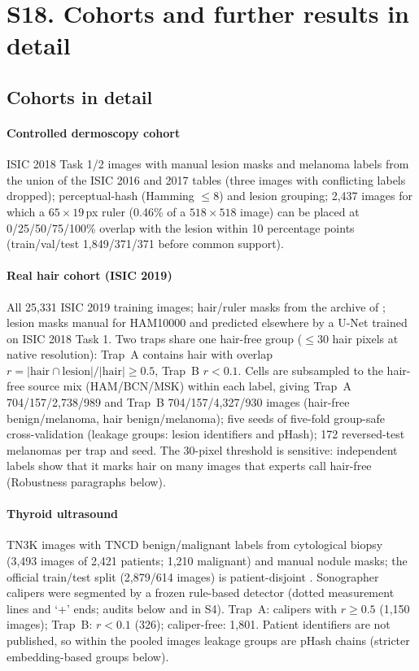 \section*{S18. Cohorts and further results in detail}\label{supp:S18}
\subsection*{Cohorts in detail}
\paragraph{Controlled dermoscopy cohort} ISIC 2018 Task 1/2 images with manual lesion masks and melanoma labels
from the union of the ISIC 2016 and 2017 tables (three images with conflicting labels dropped); perceptual-hash
(Hamming $\le 8$) and lesion grouping; 2,437 images for which a $65\times19$\,px ruler (0.46\% of a
$518\times518$ image) can be placed at 0/25/50/75/100\% overlap with the lesion within 10 percentage points
(train/val/test 1,849/371/371 before common support).

\paragraph{Real hair cohort (ISIC 2019)} All 25,331 ISIC 2019 training images; hair/ruler masks from the archive of
\citet{wegley2026artifacts}; lesion masks manual for HAM10000 \citep{tschandl2018ham} and predicted elsewhere by a
U-Net trained on ISIC 2018 Task 1. Two traps share one hair-free group ($\le 30$ hair pixels at native resolution):
Trap~A contains hair with overlap $r=|\text{hair}\cap\text{lesion}|/|\text{hair}|\ge0.5$, Trap~B $r<0.1$. Cells are
subsampled to the hair-free source mix (HAM/BCN/MSK) within each label, giving Trap~A 704/157/2,738/989 and Trap~B
704/157/4,327/930 images (hair-free benign/melanoma, hair benign/melanoma); five seeds of five-fold group-safe
cross-validation (leakage groups: lesion identifiers and pHash); 172 reversed-test melanomas per trap and seed. The
30-pixel threshold is sensitive: independent labels show that it marks hair on many images that experts call hair-free
(Robustness paragraphs below).

\paragraph{Thyroid ultrasound} TN3K images \citep{gong2021tn3k} with TNCD benign/malignant labels from cytological
biopsy \citep{gong2022acl} (3,493 images of 2,421 patients; 1,210 malignant) and manual nodule masks; the official
train/test split (2,879/614 images) is patient-disjoint \citep{gong2022acl}. Sonographer calipers were segmented by a frozen rule-based detector (dotted measurement lines
and `+' ends; audits below and in S4). Trap~A: calipers with $r\ge0.5$ (1,150 images); Trap~B: $r<0.1$ (326);
caliper-free: 1,801. Patient identifiers are not published, so within the pooled images leakage groups are pHash
chains (stricter embedding-based groups below).

